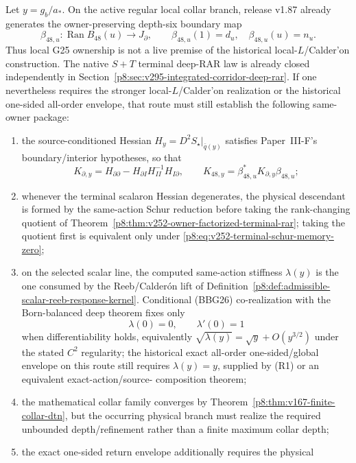 \documentclass[12pt,a4paper]{article}
\begin{document}
\begin{theorem}
\label{p8:thm:v167-critical-boundary-corealization-criterion}
Let \(y=g_b/a_*\).  On the active regular local collar branch, release v1.87
already generates the owner-preserving depth-six boundary map
\[
 \beta_{48,u}:\operatorname{Ran}B_{48}(u)\longrightarrow J_\partial,
 \qquad
 \beta_{48,u}(1)=d_u,\quad \beta_{48,u}(u)=n_u.
\]
Thus local G25 ownership is not a live premise of the historical
local-$L$/Calder'on construction.  The native $S+T$ terminal deep-RAR law is
already closed independently in Section~\ref{p8:sec:v295-integrated-corridor-deep-rar}.
If one nevertheless requires the stronger local-$L$/Calder'on realization or
the historical one-sided all-order envelope, that route must still establish
the following same-owner package:
\begin{enumerate}
 \item the source-conditioned Hessian
 \(H_y=D^2S_\star|_{\bar q(y)}\) satisfies Paper~III-F's
 boundary/interior hypotheses, so that
 \[
  K_{\partial,y}
  =H_{\partial\partial}-H_{\partial I}H_{II}^{-1}H_{I\partial},
  \qquad
  K_{48,y}=\beta_{48,u}^{*}K_{\partial,y}\beta_{48,u};
 \]
 \item whenever the terminal scalaron Hessian degenerates, the physical
 descendant is formed by the same-action Schur reduction before taking the
 rank-changing quotient of Theorem~\ref{p8:thm:v252-owner-factorized-terminal-rar};
 taking the quotient first is equivalent only under
 \eqref{p8:eq:v252-terminal-schur-memory-zero};
 \item on the selected scalar line, the computed same-action stiffness
 \(\lambda(y)\) is the one consumed by the Reeb/Calder\'on lift of
 Definition~\ref{p8:def:admissible-scalar-reeb-response-kernel}.  Conditional
 (BBG26) co-realization with the Born-balanced deep theorem fixes only
 \[
  \lambda(0)=0,\qquad \lambda'(0)=1
 \]
 when differentiability holds, equivalently
 \(\sqrt{\lambda(y)}=\sqrt y+O(y^{3/2})\) under the stated \(C^2\) regularity;
 the historical exact all-order one-sided/global envelope on this route still
 requires \(\lambda(y)=y\), supplied by (R1) or an equivalent exact-action/source-
 composition theorem;
 \item the mathematical collar family converges by
 Theorem~\ref{p8:thm:v167-finite-collar-dtn}, but the occurring physical
 branch must realize the required unbounded depth/refinement rather than a
 finite maximum collar depth;
 \item the exact one-sided return envelope additionally requires the physical

\end{enumerate}
\end{theorem}
\end{document}
